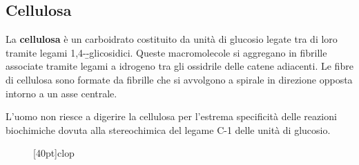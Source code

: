 
\subsection{Cellulosa}
La \textbf{cellulosa} è un carboidrato costituito da unità di glucosio legate tra di loro tramite legami 1,4-\b-glicosidici. Queste macromolecole si aggregano in fibrille associate tramite legami a idrogeno tra gli ossidrile delle catene adiacenti. Le fibre di cellulosa sono formate da fibrille che si avvolgono a spirale in direzione opposta intorno a un asse centrale.

L'uomo non riesce a digerire la cellulosa per l'estrema specificità delle reazioni biochimiche dovuta alla stereochimica del legame C-1 delle unità di glucosio.

\begin{figure}[H]
	\centering
	\makepolymerdelims{70pt}[40pt]{cl}{op}
\end{figure}

